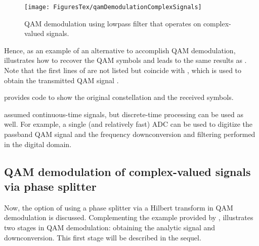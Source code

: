 \begin{figure}[htbp]
	\centering
		\texttt{[image: FiguresTex/qamDemodulationComplexSignals]}		
	\caption{QAM demodulation using lowpass filter that operates on complex-valued signals.\label{fig:qamDemodulationComplexSignals}}
\end{figure}

Hence, as an example of an alternative to accomplish QAM demodulation,  illustrates how to recover the QAM symbols and leads to the same results as .
Note that the first lines of  are not listed but coincide with  
, which is used to obtain the transmitted QAM signal . 



 provides code to show the original constellation and the received symbols.


 assumed continuous-time signals, but discrete-time processing can be used as well. For example, a single (and relatively fast) ADC can be used to digitize the passband QAM signal and the frequency downconversion and filtering performed in the digital domain.

\subsection{QAM demodulation of complex-valued signals via phase splitter}
\label{qamDemodPhaseSplitter}

Now, the option of using a phase splitter via a Hilbert transform in QAM demodulation is discussed. Complementing the example provided by ,  illustrates two stages in QAM demodulation: obtaining the analytic signal and downconversion. This first stage will be described in the sequel.

